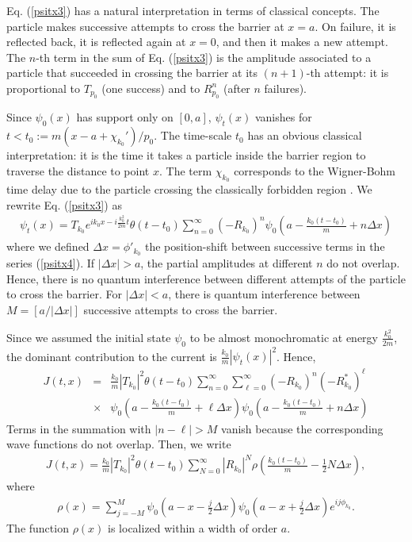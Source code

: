 \documentclass[12pt]{article}
\numberwithin{equation}{section}
\begin{document}
Eq. (\ref{psitx3}) has a natural interpretation in terms of classical concepts. The particle makes successive attempts to cross the barrier at $x = a$. On failure, it is reflected back,  it is reflected again at $x = 0$, and then it makes a new attempt. The $n$-th term in the sum of Eq. (\ref{psitx3}) is the amplitude associated to a particle that succeeded in crossing the barrier at its
 $(n+1)$-th attempt: it is proportional to $T_{p_0}$ (one success) and to $R^n_{p_0}$ (after $n$ failures).

Since $\psi_0(x)$ has support only on $[0, a]$, $\psi_t(x)$ vanishes for $t < t_0 := m (x -a + \chi_{k_0}')/p_0$. The time-scale $t_0$ has an obvious classical interpretation: it is the time it takes a particle inside the barrier region to traverse the distance to point $x$. The term $\chi_{k_0}$ corresponds to the Wigner-Bohm time delay due to the particle crossing the
classically forbidden region \cite{BohmWig}. We rewrite Eq. (\ref{psitx3}) as
\begin{eqnarray}
\psi_t(x) =  T_{k_0}  e^{ik_0x -i\frac{k_0^2}{2m}t } \theta(t-t_0)\sum_{n=0}^{\infty} (-R_{k_0})^n \psi_0\left(a - \frac{k_0(t - t_0 )}{m} + n\Delta x \right)  \label{psitx4}
\end{eqnarray}
where we defined $\Delta x = \phi'_{k_0}$ the position-shift between successive terms in the series (\ref{psitx4}). If $|\Delta x| > a$, the partial amplitudes at different $n$ do not overlap. Hence, there is no quantum interference between different attempts of the particle to cross the barrier. For $|\Delta x| < a$, there is  quantum interference between $M = [a/|\Delta x|]$ successive attempts to cross the barrier.

Since we assumed the initial state $\psi_0$ to be almost monochromatic at energy $\frac{k_0^2}{2m}$, the dominant contribution to the current is $ \frac{k_0}{m} |\psi_t(x)|^2$. Hence,
\begin{eqnarray}
J(t,x) &=& \frac{k_0}{m} |T_{k_0}|^2  \theta(t-t_0) \sum_{n=0}^{\infty} \sum_{\ell=0}^{\infty}(-R_{k_0})^n(-R_{ k_0}^{*})^{\ell}\nonumber \\
&\times& \psi_0(a- \frac{k_0(t - t_0 )}{m} + \ell \Delta x )\psi_0(a- \frac{k_0(t - t_0 )}{m} + n \Delta x ) \label{jxt1}
\end{eqnarray}
Terms in the summation with $|n- \ell| > M$ vanish because the corresponding wave functions do not overlap. Then, we write
\begin{eqnarray}
J(t,x) = \frac{k_0}{m} |T_{k_0}|^2  \theta(t-t_0) \sum_{N=0}^{\infty}|R_{k_0}|^N \rho\left(\frac{k_0(t - t_0 )}{m} - \frac{1}{2} N\Delta x  \right), \label{jtx3}
\end{eqnarray}
where
\begin{eqnarray}
\rho(x) = \sum_{j=-M}^M \psi_0(a - x - \frac{j}{2} \Delta x) \psi_0(a - x +\frac{j}{2} \Delta x) e^{i j\phi_{k_0}}.
\end{eqnarray}
The function $\rho(x)$ is localized within a width of order $a$.
\end{document}
